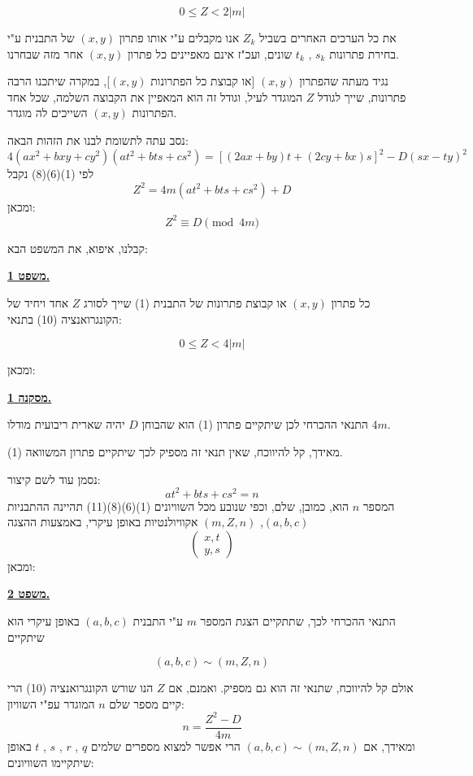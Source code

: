 \[ 0 \leq Z < 2|m| \tag{8} \]

\noindent את כל הערכים האחרים בשביל $Z_k$ אנו מקבלים ע"י אותו פתרון $(x,y)$ של התבנית ע"י בחירת פתרונות $s_k$ , $t_k$ שונים, ועכ"ז אינם מאפיינים כל פתרון $(x,y)$ אחר מזה שבחרנו.

\noindent נגיד מעתה שהפתרון $(x,y)$ [או קבוצת כל הפתרונות $(x,y)$], במקרה שיתכנו הרבה פתרונות, שייך לגודל $Z$ המוגדר לעיל, וגודל זה הוא המאפיין את הקבוצה השלמה, שכל אחד הפתרונות $(x,y)$ השייכים לה מוגדר.

\noindent נסב עתה לתשומת לבנו את הזהות הבאה:
\[ 4(ax^2+bxy+cy^2)(at^2+bts+cs^2) = \left[(2ax+by)t + (2cy+bx)s\right]^2 - D(sx-ty)^2 \]
\noindent לפי (1)(6)(8) נקבל
\[ Z^2 = 4m(at^2+bts+cs^2) + D \tag{9} \]
\noindent ומכאן:
\[ Z^2 \equiv D \pmod{4m} \tag{10} \]

\noindent קבלנו, איפוא, את המשפט הבא:

\bigskip
\noindent\textbf{\underline{משפט 1.}}

\noindent כל פתרון $(x,y)$ או קבוצת פתרונות של התבנית (1) שייך לסורג $Z$ אחד ויחיד של הקונגרואנציה (10) בתנאי:

\[ 0 \leq Z < 4|m| \]

\medskip
\noindent ומכאן:

\bigskip
\noindent\textbf{\underline{מסקנה 1.}}

\noindent התנאי ההכרחי לכן שיתקיים פתרון (1) הוא שהבוחן $D$ יהיה שארית ריבועית מודלו $4m$.

\medskip
\noindent מאידך, קל להיווכח, שאין תנאי זה מספיק לכך שיתקיים פתרון המשוואה (1).

\noindent נסמן עוד לשם קיצור:
\[ at^2 + bts + cs^2 = n \tag{11} \]
\noindent המספר $n$ הוא, כמובן, שלם, וכפי שנובע מכל השוויונים (1)(6)(8)(11) תהיינה ההתבניות $(a,b,c)$, $(m,Z,n)$ אקוויולנטיות באופן עיקרי, באמצעות ההצגה
\[ \begin{pmatrix} x , t \\ y , s \end{pmatrix} \]
\noindent ומכאן:

\bigskip
\noindent\textbf{\underline{משפט 2.}}

\noindent התנאי ההכרחי לכך, שתתקיים הצגת המספר $m$ ע"י התבנית $(a,b,c)$ באופן עיקרי הוא שיתקיים

\[ (a,b,c) \sim (m,Z,n) \]

\medskip
\noindent אולם קל להיווכח, שתנאי זה הוא גם מספיק. ואמנם, אם $Z$ הנו שורש הקונגרואנציה (10) הרי קיים מספר שלם $n$ המוגדר עפ"י השוויון:
\[ n = \frac{Z^2 - D}{4m} \tag{12} \]
\noindent ומאידך, אם $(a,b,c) \sim (m,Z,n)$ הרי אפשר למצוא מספרים שלמים $q$ , $r$ , $s$ , $t$ באופן שיתקיימו השוויונים:

